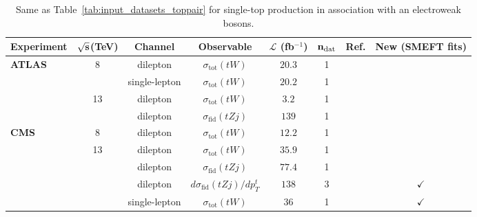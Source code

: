 \begin{table}[t]
  \begin{center}
{\fontsize{8pt}{8pt}\selectfont
  \centering
   \renewcommand{\arraystretch}{2}
   \setlength{\tabcolsep}{5pt}
   \begin{tabular}{lcccccc|c}
     \toprule \textbf{Experiment}     & $\bf{\sqrt{s}}$\textbf{(TeV)}
     &   \textbf{Channel} & \textbf{Observable} & $\mathcal{L}$ (fb${}^{-1}$) & $\mathbf{n_{\rm dat}}$ & \textbf{Ref.}   
     &  \textbf{New (SMEFT fits)} \\
    \toprule
      {\bf ATLAS}
      & 8
      & dilepton
      & $\sigma_{\text{tot}}(tW)$
      & $20.3$
      & 1
      & \cite{Aad:2015eto}
      & \\
      & 
      & single-lepton
      & $\sigma_{\text{tot}}(tW)$
      & $20.2$
      & 1
      & \cite{Aad:2020zhd}
      & \\
      \midrule
      & 13
      & dilepton
      & $\sigma_{\text{tot}}(tW)$
      & $3.2$
      & 1
      & \cite{Aaboud:2016lpj}
     &  \\
      & 
      & dilepton
      & $\sigma_{\text{fid}}(tZj)$
      & $139$
      & 1
      & \cite{Aad:2020wog}
      & \\
     \midrule
      {\bf CMS}
      & 8
      & dilepton
      & $\sigma_{\text{tot}}(tW)$
      & $12.2$
      & 1
      & \cite{Chatrchyan:2014tua}
      &   \\
      \midrule
      & 13
      & dilepton
      & $\sigma_{\text{tot}}(tW)$
      & $35.9$
      & 1
      & \cite{Sirunyan:2018lcp}
      & \\
      & 
      & dilepton
      & $\sigma_{\text{fid}}(tZj)$
      & $77.4$
      & 1
      & \cite{Sirunyan:2018zgs}
     & \\
      &
      & dilepton
      & $d\sigma_{\text{fid}}(tZj)/dp_T^t$
      & $138$
      & 3
      & \cite{CMS:2021rvz}
      & $\checkmark$\\
      & 
      & single-lepton
      & $\sigma_{\text{tot}}(tW)$
      & $36$
      & 1
      & \cite{CMS:2021vqm}
      & $\checkmark$\\
\bottomrule
   \end{tabular}
   \vspace{0.3cm}
  \caption{\small Same as Table~\ref{tab:input_datasets_toppair} for
    single-top production in association with an electroweak bosons.
}
   \label{tab:input_datasets_4}
}
\end{center}
\end{table}
